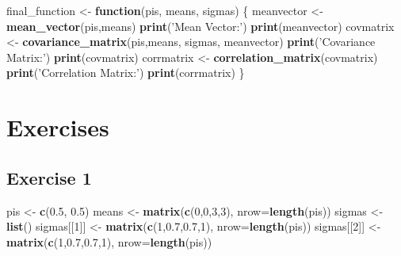 \documentclass[]{article}
\newenvironment{Shaded}{\begin{snugshade}}{\end{snugshade}}
\newcommand{\ControlFlowTok}[1]{\textcolor[rgb]{0.13,0.29,0.53}{\textbf{#1}}}
\newcommand{\DataTypeTok}[1]{\textcolor[rgb]{0.13,0.29,0.53}{#1}}
\newcommand{\DecValTok}[1]{\textcolor[rgb]{0.00,0.00,0.81}{#1}}
\newcommand{\FloatTok}[1]{\textcolor[rgb]{0.00,0.00,0.81}{#1}}
\newcommand{\KeywordTok}[1]{\textcolor[rgb]{0.13,0.29,0.53}{\textbf{#1}}}
\newcommand{\NormalTok}[1]{#1}
\newcommand{\StringTok}[1]{\textcolor[rgb]{0.31,0.60,0.02}{#1}}
\begin{document}
\begin{Shaded}
\begin{Highlighting}[]
\NormalTok{final_function <-}\StringTok{ }\ControlFlowTok{function}\NormalTok{(pis, means, sigmas) \{}
\NormalTok{    meanvector <-}\StringTok{ }\KeywordTok{mean_vector}\NormalTok{(pis,means)}
    \KeywordTok{print}\NormalTok{(}\StringTok{'Mean Vector:'}\NormalTok{)}
    \KeywordTok{print}\NormalTok{(meanvector)}
\NormalTok{    covmatrix <-}\StringTok{ }\KeywordTok{covariance_matrix}\NormalTok{(pis,means, sigmas, meanvector)}
    \KeywordTok{print}\NormalTok{(}\StringTok{'Covariance Matrix:'}\NormalTok{)}
    \KeywordTok{print}\NormalTok{(covmatrix)}
\NormalTok{    corrmatrix <-}\StringTok{ }\KeywordTok{correlation_matrix}\NormalTok{(covmatrix)}
    \KeywordTok{print}\NormalTok{(}\StringTok{'Correlation Matrix:'}\NormalTok{)}
    \KeywordTok{print}\NormalTok{(corrmatrix)}
\NormalTok{\}}
\end{Highlighting}
\end{Shaded}

\newpage

\hypertarget{exercises}{%
\section{Exercises}\label{exercises}}

\hypertarget{exercise-1}{%
\subsection{Exercise 1}\label{exercise-1}}

\begin{Shaded}
\begin{Highlighting}[]
\NormalTok{pis <-}\StringTok{ }\KeywordTok{c}\NormalTok{(}\FloatTok{0.5}\NormalTok{, }\FloatTok{0.5}\NormalTok{)}
\NormalTok{means <-}\StringTok{ }\KeywordTok{matrix}\NormalTok{(}\KeywordTok{c}\NormalTok{(}\DecValTok{0}\NormalTok{,}\DecValTok{0}\NormalTok{,}\DecValTok{3}\NormalTok{,}\DecValTok{3}\NormalTok{), }\DataTypeTok{nrow=}\KeywordTok{length}\NormalTok{(pis))}
\NormalTok{sigmas <-}\StringTok{ }\KeywordTok{list}\NormalTok{()}
\NormalTok{sigmas[[}\DecValTok{1}\NormalTok{]] <-}\StringTok{ }\KeywordTok{matrix}\NormalTok{(}\KeywordTok{c}\NormalTok{(}\DecValTok{1}\NormalTok{,}\FloatTok{0.7}\NormalTok{,}\FloatTok{0.7}\NormalTok{,}\DecValTok{1}\NormalTok{), }\DataTypeTok{nrow=}\KeywordTok{length}\NormalTok{(pis))}
\NormalTok{sigmas[[}\DecValTok{2}\NormalTok{]] <-}\StringTok{ }\KeywordTok{matrix}\NormalTok{(}\KeywordTok{c}\NormalTok{(}\DecValTok{1}\NormalTok{,}\FloatTok{0.7}\NormalTok{,}\FloatTok{0.7}\NormalTok{,}\DecValTok{1}\NormalTok{), }\DataTypeTok{nrow=}\KeywordTok{length}\NormalTok{(pis))}
\end{Highlighting}
\end{Shaded}
\end{document}

